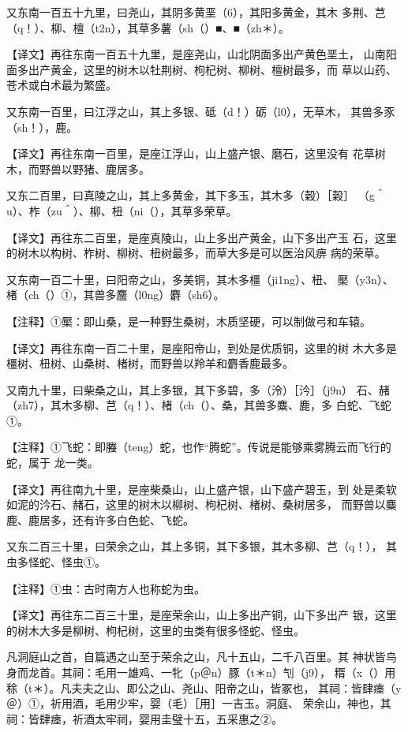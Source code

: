 \documentclass[a4paper,12pt,UTF8,twoside]{ctexbook}
\begin{document}
又东南一百五十九里，曰尧山，其阴多黄垩（6），其阳多黄金，其木 多荆、芑（q！）、柳、檀（t2n），其草多薯（sh（）■、■（zh＊）。

【译文】再往东南一百五十九里，是座尧山，山北阴面多出产黄色垩土， 山南阳面多出产黄金，这里的树木以牡荆树、枸杞树、柳树、檀树最多，而 草以山药、苍术或白术最为繁盛。

又东南一百里，曰江浮之山，其上多银、砥（d！）砺（l0），无草木， 其兽多豕（sh！），鹿。

【译文】再往东南一百里，是座江浮山，山上盛产银、磨石，这里没有 花草树木，而野兽以野猪、鹿居多。

又东二百里，曰真陵之山，其上多黄金，其下多玉，其木多（穀）［榖］ （g＾u）、柞（zu＾）、柳、杻（ni（），其草多荣草。

【译文】再往东二百里，是座真陵山，山上多出产黄金，山下多出产玉 石，这里的树木以构树、柞树、柳树、杻树最多，而草大多是可以医治风痹 病的荣草。

又东南一百二十里，曰阳帝之山，多美铜，其木多橿（ji1ng）、杻、 檿（y3n）、楮（ch（）①，其兽多麢（l0ng）麝（sh6）。

【注释】①檿：即山桑，是一种野生桑树，木质坚硬，可以制做弓和车辕。

【译文】再往东南一百二十里，是座阳帝山，到处是优质铜，这里的树 木大多是橿树、杻树、山桑树、楮树，而野兽以羚羊和麝香鹿最多。

又南九十里，曰柴桑之山，其上多银，其下多碧，多（泠）［汵］（j9n） 石、赭（zh7），其木多柳、芑（q！）、楮（ch（）、桑，其兽多麋、鹿，多 白蛇、飞蛇①。

【注释】①飞蛇：即螣（teng）蛇，也作“腾蛇”。传说是能够乘雾腾云而飞行的蛇，属于 龙一类。

【译文】再往南九十里，是座柴桑山，山上盛产银，山下盛产碧玉，到 处是柔软如泥的汵石、赭石，这里的树木以柳树、枸杞树、楮树、桑树居多， 而野兽以麋鹿、鹿居多，还有许多白色蛇、飞蛇。

又东二百三十里，曰荣余之山，其上多铜，其下多银，其木多柳、芑（q！）， 其虫多怪蛇、怪虫①。

【注释】①虫：古时南方人也称蛇为虫。

【译文】再往东二百三十里，是座荣余山，山上多出产铜，山下多出产 银，这里的树木大多是柳树、枸杞树，这里的虫类有很多怪蛇、怪虫。

凡洞庭山之首，自篇遇之山至于荣余之山，凡十五山，二千八百里。其 神状皆鸟身而龙首。其祠：毛用一雄鸡、一牝（p＠n）豚（t＊n）刏（j9）， 糈（x（）用稌（t＊）。凡夫夫之山、即公之山、尧山、阳帝之山，皆冢也， 其祠：皆肆瘗（y＠）①，祈用酒，毛用少牢，婴（毛）［用］一吉玉。洞庭、 荣余山，神也，其祠：皆肆瘗，祈酒太牢祠，婴用圭璧十五，五采惠之②。
\end{document}
